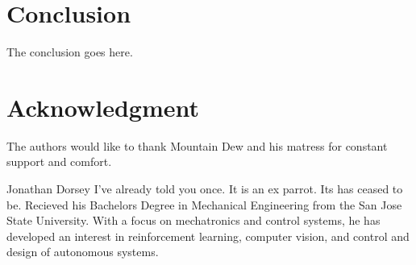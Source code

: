 \documentclass[journal]{IEEEtran}
\begin{document}
\section{Conclusion}
The conclusion goes here.


%
%


\section*{Acknowledgment}


The authors would like to thank Mountain Dew and his matress for constant support and comfort.



\ifCLASSOPTIONcaptionsoff
  \newpage
\fi



%
%
%
%
\cite{craig_introduction_2005}
\cite{khalil_nonlinear_2002}
\cite{rawlings_model_2017}
\cite{armstrong_explicit_1986}
\cite{ogata_modern_2010}
\cite{meriam_engineering_1993}
\cite{greenwood_advanced_2006}
\cite{borrelli_predictive_2017}
\cite{boyd_convex_2004}
\cite{slotine_applied_1991}
\cite{soft_constraints}

\printbibliography

\begin{IEEEbiography}{Jonathan Dorsey}
  I've already told you once. It is an ex parrot. Its has ceased to be. Recieved his Bachelors Degree in Mechanical Engineering from the San Jose State University. With a focus on mechatronics and control systems, he has developed an interest in reinforcement learning, computer vision, and control and design of autonomous systems.
\end{IEEEbiography}
\end{document}
